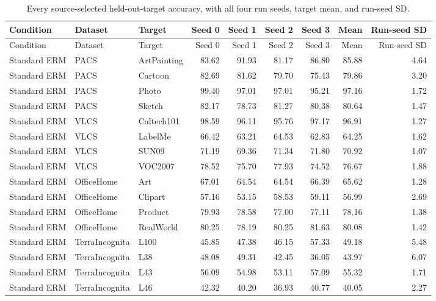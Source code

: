 \begin{longtable}{lllrrrrrr}
\caption{Every source-selected held-out-target accuracy, with all four run
seeds, target mean, and run-seed SD.}
\label{tab:all-target-accuracies}\\
\toprule
Condition & Dataset & Target & Seed 0 & Seed 1 & Seed 2 & Seed 3 & Mean & Run-seed SD \\
\midrule
\endfirsthead
\toprule
Condition & Dataset & Target & Seed 0 & Seed 1 & Seed 2 & Seed 3 & Mean & Run-seed SD \\
\midrule
\endhead
\bottomrule
\endlastfoot
Standard ERM & PACS & ArtPainting & 83.62 & 91.93 & 81.17 & 86.80 & 85.88 & 4.64 \\
Standard ERM & PACS & Cartoon & 82.69 & 81.62 & 79.70 & 75.43 & 79.86 & 3.20 \\
Standard ERM & PACS & Photo & 99.40 & 97.01 & 97.01 & 95.21 & 97.16 & 1.72 \\
Standard ERM & PACS & Sketch & 82.17 & 78.73 & 81.27 & 80.38 & 80.64 & 1.47 \\
Standard ERM & VLCS & Caltech101 & 98.59 & 96.11 & 95.76 & 97.17 & 96.91 & 1.27 \\
Standard ERM & VLCS & LabelMe & 66.42 & 63.21 & 64.53 & 62.83 & 64.25 & 1.62 \\
Standard ERM & VLCS & SUN09 & 71.19 & 69.36 & 71.34 & 71.80 & 70.92 & 1.07 \\
Standard ERM & VLCS & VOC2007 & 78.52 & 75.70 & 77.93 & 74.52 & 76.67 & 1.88 \\
Standard ERM & OfficeHome & Art & 67.01 & 64.54 & 64.54 & 66.39 & 65.62 & 1.28 \\
Standard ERM & OfficeHome & Clipart & 57.16 & 53.15 & 58.53 & 59.11 & 56.99 & 2.69 \\
Standard ERM & OfficeHome & Product & 79.93 & 78.58 & 77.00 & 77.11 & 78.16 & 1.38 \\
Standard ERM & OfficeHome & RealWorld & 80.25 & 78.19 & 80.25 & 81.63 & 80.08 & 1.42 \\
Standard ERM & TerraIncognita & L100 & 45.85 & 47.38 & 46.15 & 57.33 & 49.18 & 5.48 \\
Standard ERM & TerraIncognita & L38 & 48.08 & 49.31 & 42.45 & 36.05 & 43.97 & 6.07 \\
Standard ERM & TerraIncognita & L43 & 56.09 & 54.98 & 53.11 & 57.09 & 55.32 & 1.71 \\
Standard ERM & TerraIncognita & L46 & 42.32 & 40.20 & 36.93 & 40.77 & 40.05 & 2.27 \\

\end{longtable}
